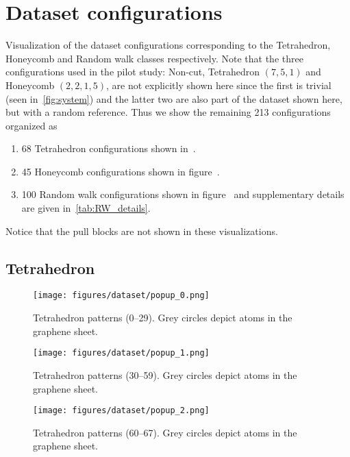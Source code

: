 \chapter{Dataset configurations}\label{sec:dataset_conf}
Visualization of the dataset configurations corresponding to the Tetrahedron, Honeycomb and Random walk classes respectively. Note that the three configurations used in the pilot study: Non-cut, Tetrahedron $(7,5,1)$ and Honeycomb $(2,2,1,5)$, are not explicitly shown here since the first is trivial (seen in~\cref{fig:system}) and the latter two are also part of the dataset shown here, but with a random reference. Thus we show the remaining 213 configurations organized as
\begin{enumerate}
    \item 68 Tetrahedron configurations shown in~.
    \item 45 Honeycomb configurations shown in figure~.
    \item 100 Random walk configurations shown in figure~ and supplementary details are given in~\cref{tab:RW_details}.
\end{enumerate}
Notice that the pull blocks are not shown in these visualizations.
\newpage

\section{Tetrahedron}
\begin{figure}[H]
    \centering
    \texttt{[image: figures/dataset/popup\_0.png]}
    \caption{Tetrahedron patterns (0--29). Grey circles depict atoms in the graphene sheet.}\label{fig:T0 Grey circles depict atoms in the graphene sheet.}
\end{figure}
\begin{figure}[H]
    \centering
    \texttt{[image: figures/dataset/popup\_1.png]}
    \caption{Tetrahedron patterns (30--59). Grey circles depict atoms in the graphene sheet.}\label{fig:T1 Grey circles depict atoms in the graphene sheet.}
\end{figure}
\begin{figure}[H]
    \centering
    \texttt{[image: figures/dataset/popup\_2.png]}
    \caption{Tetrahedron patterns (60--67). Grey circles depict atoms in the graphene sheet.}\label{fig:T2 Grey circles depict atoms in the graphene sheet.}
\end{figure}


